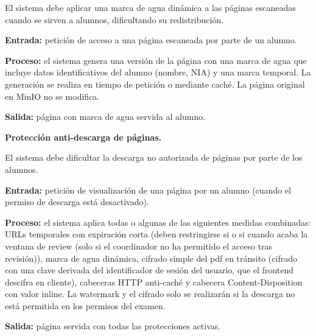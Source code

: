 \begin{functional}
\begin{functional}
    El sistema debe aplicar una marca de agua dinámica a las páginas escaneadas cuando se sirven a alumnos, dificultando su redistribución.

    \textbf{Entrada:} petición de acceso a una página escaneada por parte de un alumno.

    \textbf{Proceso:} el sistema genera una versión de la página con una marca de agua que incluye datos identificativos del alumno (nombre, NIA) y una marca temporal. La generación se realiza en tiempo de petición o mediante caché. La página original en MinIO no se modifica.

    \textbf{Salida:} página con marca de agua servida al alumno.

    \item \textbf{Protección anti-descarga de páginas.}

    El sistema debe dificultar la descarga no autorizada de páginas por parte de los alumnos.

    \textbf{Entrada:} petición de visualización de una página por un alumno (cuando el permiso de descarga está desactivado).

    \textbf{Proceso:} el sistema aplica todas o algunas de las siguientes medidas combinadas: URLs temporales con expiración corta (deben restringirse si o si cuando acaba la ventana de review (solo si el coordinador no ha permitido el acceso tras revisión)), marca de agua dinámica, cifrado simple del pdf en tránsito (cifrado con una clave derivada del identificador de sesión del usuario, que el frontend descifra en cliente), cabeceras HTTP anti-caché y cabecera Content-Disposition con valor inline. La watermark y el cifrado solo se realizarán si la descarga no está permitida en los permisos del examen.

    \textbf{Salida:} página servida con todas las protecciones activas.

  \end{functional}

\end{functional}
